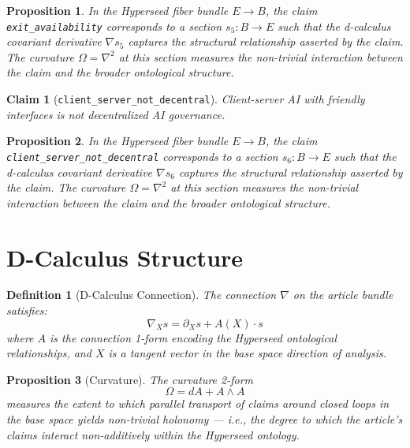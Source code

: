 \documentclass{article}
\newtheorem{claim}{Claim}
\newtheorem{definition}{Definition}
\newtheorem{proposition}{Proposition}
\begin{document}
\begin{proposition}
In the Hyperseed fiber bundle $E \to B$, the claim \texttt{exit_availability} corresponds to a section $s_5: B \to E$ such that the d-calculus covariant derivative $\nabla s_5$ captures the structural relationship asserted by the claim. The curvature $\Omega = \nabla^2$ at this section measures the non-trivial interaction between the claim and the broader ontological structure.
\end{proposition}

\begin{claim}[\texttt{client_server_not_decentral}]
Client-server AI with friendly interfaces is not decentralized AI governance.
\end{claim}

\begin{proposition}
In the Hyperseed fiber bundle $E \to B$, the claim \texttt{client_server_not_decentral} corresponds to a section $s_6: B \to E$ such that the d-calculus covariant derivative $\nabla s_6$ captures the structural relationship asserted by the claim. The curvature $\Omega = \nabla^2$ at this section measures the non-trivial interaction between the claim and the broader ontological structure.
\end{proposition}

\section{D-Calculus Structure}

\begin{definition}[D-Calculus Connection]
The connection $\nabla$ on the article bundle satisfies:
\begin{equation}
  \nabla_X s = \partial_X s + A(X) \cdot s
\end{equation}
where $A$ is the connection 1-form encoding the Hyperseed ontological relationships, and $X$ is a tangent vector in the base space direction of analysis.
\end{definition}

\begin{proposition}[Curvature]
The curvature 2-form
\begin{equation}
  \Omega = dA + A \wedge A
\end{equation}
measures the extent to which parallel transport of claims around closed loops in the base space yields non-trivial holonomy --- i.e., the degree to which the article's claims interact non-additively within the Hyperseed ontology.
\end{proposition}
\end{document}
